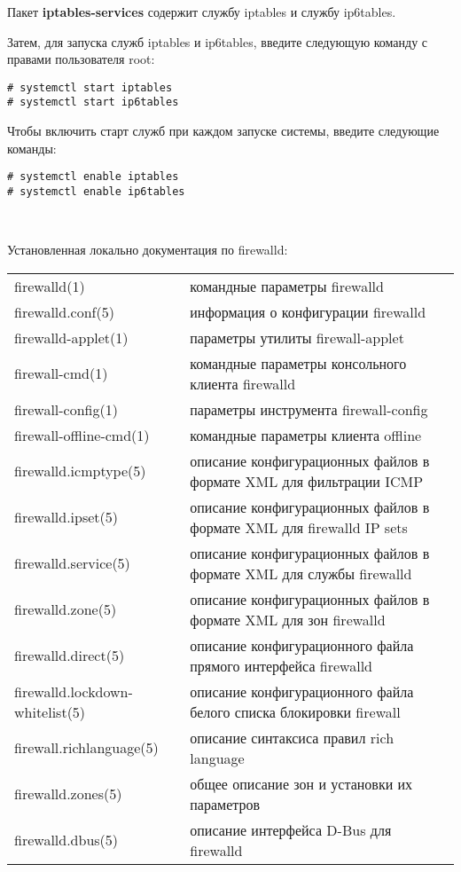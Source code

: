\documentclass[a4paper,10pt,twoside]{article}
\begin{document}
Пакет \textbf{iptables-services} содержит службу iptables и службу ip6tables.

Затем, для запуска служб iptables и ip6tables, введите следующую команду с правами пользователя root: 
\begin{verbatim}
# systemctl start iptables
# systemctl start ip6tables
\end{verbatim} 

Чтобы включить старт служб при каждом запуске системы, введите следующие команды:
\begin{verbatim}
# systemctl enable iptables
# systemctl enable ip6tables
\end{verbatim} 
⁠

Установленная локально документация по firewalld:
\begin{longtable}{  m{5cm}  m{10cm}  }  
firewalld(1) & командные параметры firewalld\\
firewalld.conf(5) & информация о конфигурации firewalld\\
firewalld-applet(1) & параметры утилиты firewall-applet\\
firewall-cmd(1) & командные параметры консольного клиента firewalld\\
firewall-config(1) & параметры инструмента firewall-config\\
firewall-offline-cmd(1) & командные параметры клиента offline\\
firewalld.icmptype(5) & описание конфигурационных файлов в формате XML для фильтрации ICMP\\
firewalld.ipset(5) & описание конфигурационных файлов в формате XML для firewalld IP sets\\
firewalld.service(5) & описание конфигурационных файлов в формате XML для службы firewalld\\
firewalld.zone(5) & описание конфигурационных файлов в формате XML для зон firewalld\\
firewalld.direct(5) & описание конфигурационного файла прямого интерфейса firewalld\\ 
firewalld.lockdown-whitelist(5) & описание конфигурационного файла белого списка блокировки firewall\\
firewall.richlanguage(5) & описание синтаксиса правил rich language\\ 
firewalld.zones(5) & общее описание зон и установки их параметров\\
firewalld.dbus(5) & описание интерфейса D-Bus для firewalld\\
\end{longtable}
\end{document}
